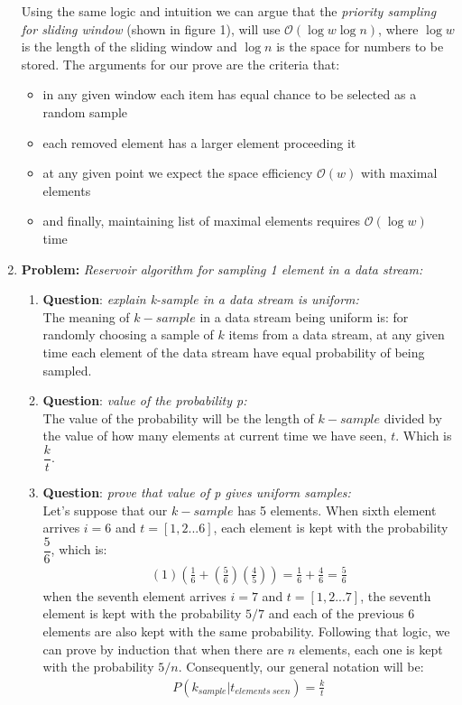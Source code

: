 \documentclass[11pt,a4paper,english]{article}
\begin{document}
\begin{enumerate}
        Using the same logic and intuition we can argue that the \textit{priority sampling for sliding window} (shown in figure 1), will use $\mathcal{O}(\log{w}\log{n})$, where $\log{w}$ is the length of the sliding window and $\log{n}$ is the space for numbers to be stored. The arguments for our prove are the criteria that:
        \begin{itemize}
          \item in any given window each item has equal chance to be selected as a random sample
          \item each removed element has a larger element proceeding it
          \item at any given point we expect the space efficiency $\mathcal{O}(w)$ with maximal elements
          \item and finally, maintaining list of maximal elements requires  $\mathcal{O}(\log{w})$ time
        \end{itemize}
      \item \textbf{Problem:} \textit{Reservoir algorithm for sampling 1 element in a data stream:}
        \begin{enumerate}
          \item \textbf{Question}: \textit{explain k-sample in a data stream is uniform:} \\
            The meaning of $k-sample$ in a data stream being uniform is: for randomly choosing a sample of $k$ items from a data stream, at any given time each element of the data stream have equal probability of being sampled.

          \item \textbf{Question}: \textit{value of the probability p:} \\
            The value of the probability will be the length of $k-sample$ divided by the value of how many elements at current time we have seen, $t$. Which is $\dfrac{k}{t}$.

          \item \textbf{Question}: \textit{prove that value of p gives uniform samples:} \\
            Let's suppose that our $k-sample$ has 5 elements. When sixth element arrives $i=6$ and $t=[1,2...6]$, each element is kept with the probability $\dfrac{5}{6}$, which is:
            \begin{align*}
              (1)(\frac{1}{6} + (\frac{5}{6})(\frac{4}{5})) = \frac{1}{6} + \frac{4}{6} = \frac{5}{6}
            \end{align*}
            when the seventh element arrives $i=7$ and $t=[1,2...7]$, the seventh element is kept with the probability $5/7$ and each of the previous $6$ elements are also kept with the same probability. Following that logic, we can prove by induction that when there are $n$ elements, each one is kept with the probability $5/n$. Consequently, our general notation will be:
            \begin{align*}
              P(k_{sample}|t_{elements\ seen}) = \frac{k}{t}
            \end{align*}


\end{enumerate}
\end{enumerate}
\end{document}
